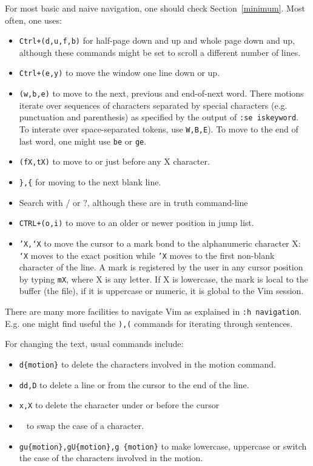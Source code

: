 \documentclass{article}
\begin{document}
For most basic and naive navigation, one should check Section~\ref{minimum}.
Most often, one uses:
\begin{itemize}
  \item \texttt{Ctrl+(d,u,f,b)} for half-page down and up
and whole page down and up, although these commands might
be set to scroll a different number of lines.
  \item \texttt{Ctrl+(e,y)} to move the window one line down or up.
  \item \texttt{(w,b,e)} to move to the next, previous and end-of-next word. There motions iterate over sequences of characters separated
    by special characters (e.g. punctuation and parenthesis) as
    specified by the output of \texttt{:se iskeyword}.
    To interate over space-separated tokens, use \texttt{W,B,E}).
    To move to the end of last word, one might use \texttt{be}
    or \texttt{ge}.
  \item \texttt{(fX,tX)} to move to or just before any X character.
  \item \texttt{\},\{} for moving to the next blank line.
  \item Search with / or ?, although these are in truth command-line 
  \item \texttt{CTRL+(o,i)} to move to an older or newer position in
    jump list.
  \item \texttt{'X,`X} to move the cursor to a mark bond to the alphanumeric character X: \texttt{`X} moves to the exact position while \texttt{'X} moves to
    the first non-blank character of the line.
    A mark is registered by the user in any cursor position
    by typing \texttt{mX}, where X is any letter.
    If X is lowercase, the mark is local to the buffer (the file),
    if it is uppercase or numeric, it is global to the Vim session.
\end{itemize}

There are many more facilities to navigate Vim
as explained in \texttt{:h navigation}.
E.g. one might find useful the \texttt{),(} commands
for iterating through sentences.

For changing the text, usual commands include:
\begin{itemize}
  \item \texttt{d\{motion\}} to delete the characters
    involved in the motion command.
  \item \texttt{dd,D} to delete a line or from the cursor to the end of the line.
  \item \texttt{x,X} to delete the character under or before the cursor  \item \texttt{~} to swap the case of a character.
  \item \texttt{gu\{motion\},gU\{motion\},g~\{motion\}} to make lowercase, uppercase or switch the case of the characters involved in the motion.
\end{itemize}
\end{document}

